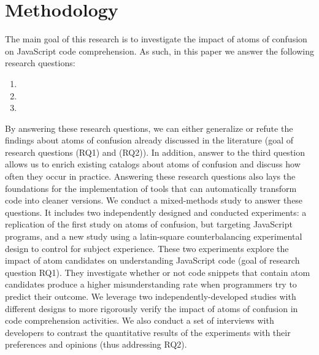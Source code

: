 \section{Methodology}
\label{method}

The main goal of this research is to investigate the impact of atoms of confusion on JavaScript code comprehension. As such, in this paper we answer the following research questions: 

\begin{enumerate}[(RQ1)]
\item \rqa 
\item \rqb
\item \rqd{}
\end{enumerate}


By answering these research questions, we can either generalize or refute the findings about atoms of confusion already discussed in the literature (goal of research questions (RQ1) and (RQ2)). In addition, answer to the third question allows us to enrich existing catalogs about atoms of confusion and discuss how often they occur in practice. Answering these research questions also lays the foundations for the implementation of tools that can automatically transform code into cleaner versions.
We conduct a mixed-methods study to answer these questions. It includes two independently designed and conducted experiments: a replication of the first study on atoms of confusion, but targeting JavaScript programs, and a new study using a latin-square counterbalancing experimental design to control for subject experience. 
These two experiments explore the impact of atom candidates on understanding JavaScript code (goal of research question RQ1). They investigate whether or not code snippets that contain atom candidates produce a higher misunderstanding rate when programmers try to predict their outcome.%
We leverage two independently-developed studies with different designs to more rigorously verify the impact of atoms of confusion in code comprehension activities. 
We also conduct a set of interviews with developers to contrast the quantitative results of the experiments with their preferences and opinions (thus addressing RQ2). 

